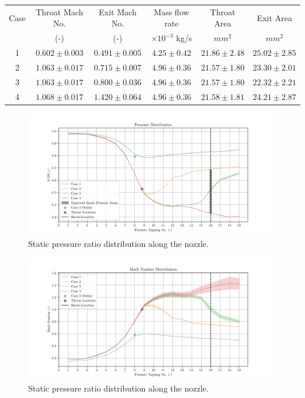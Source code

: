 \documentclass{article}
\begin{document}
\begin{center}
    \begin{tabular}{|c|c|c|c|c|c|}
    \hline 
    Case & Throat Mach No.  & Exit Mach No. & Mass flow rate & Throat Area & Exit Area\\
     & (-) & (-) & $\times 10^{-3}$ kg/s & $mm^2$ & $mm^2$ \\
    \hline 
    1 & $0.602\pm 0.003$ & $0.491\pm 0.005$ & $ 4.25\pm 0.42  $ & $21.86 \pm 2.48 $ & $25.02 \pm 2.85 $ \\
    2 & $1.063\pm 0.017$ & $0.715\pm 0.007$ & $ 4.96\pm 0.36  $ & $21.57 \pm 1.80 $ & $23.30 \pm 2.01 $ \\
    3 & $1.063\pm 0.017$ & $0.800\pm 0.036$ & $ 4.96\pm 0.36 $ & $21.57 \pm 1.80 $ & $22.32 \pm 2.21 $ \\
    4 & $1.068\pm 0.017$ & $1.420\pm 0.064$ & $ 4.96\pm 0.36 $ & $21.58 \pm 1.81 $ & $24.21 \pm 2.87 $ \\
    \hline
    \end{tabular}
    \captionsetup{hypcap=true}
    \label{tab:1}
\end{center}
 
\begin{figure}[H]
    \centering
    \includegraphics[width=0.98\textwidth]{../Supersonic_Nozzle/pressure_ratio_distribution_corrected.png}
    \caption{Static pressure ratio distribution along the nozzle.}
    \label{fig:pressure_distribution}
\end{figure}

\begin{figure}[H]
    \centering
    \includegraphics[width=0.98\textwidth]{../Supersonic_Nozzle/mach_number_distribution_corrected.png}
    \caption{Static pressure ratio distribution along the nozzle.}
    \label{fig:mach_distribution}
\end{figure}
\end{document}
